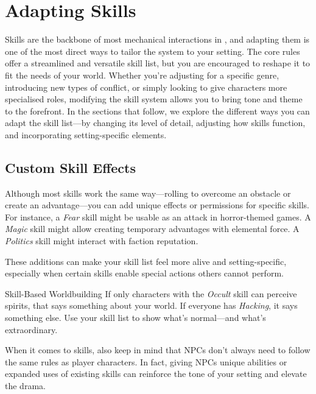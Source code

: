 
\section{Adapting Skills}\label{toolbox:sec:adapting-skills}

Skills are the backbone of most mechanical interactions in \wyrd, and adapting them is one of the most direct ways to tailor the system to your setting. The core rules offer a streamlined and versatile skill list, but you are encouraged to reshape it to fit the needs of your world. Whether you're adjusting for a specific genre, introducing new types of conflict, or simply looking to give characters more specialised roles, modifying the skill system allows you to bring tone and theme to the forefront. In the sections that follow, we explore the different ways you can adapt the skill list—by changing its level of detail, adjusting how skills function, and incorporating setting-specific elements.

\subsection{Custom Skill Effects}\label{toolbox:custom-skill-effects}

Although most skills work the same way—rolling to overcome an obstacle or create an advantage—you can add unique effects or permissions for specific skills. For instance, a \textit{Fear} skill might be usable as an attack in horror-themed games. A \textit{Magic} skill might allow creating temporary advantages with elemental force. A \textit{Politics} skill might interact with faction reputation.

These additions can make your skill list feel more alive and setting-specific, especially when certain skills enable special actions others cannot perform.

\begin{CommentBox}{Skill-Based Worldbuilding}
    If only characters with the \textit{Occult} skill can perceive spirits, that says something about your world.  
    If everyone has \textit{Hacking}, it says something else. Use your skill list to show what’s normal—and what’s extraordinary.
\end{CommentBox}

When it comes to skills, also keep in mind that NPCs don’t always need to follow the same rules as player characters. In fact, giving NPCs unique abilities or expanded uses of existing skills can reinforce the tone of your setting and elevate the drama.
    
